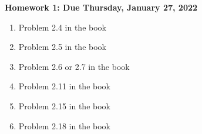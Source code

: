 \documentclass[11pt]{article}
\begin{document}
\newcommand{\problem}[1]{%
\item {#1}
}
\newcommand{\probl}[1]{\label{#1}}
\def\be{\begin{equation}}
\def\ee{\end{equation}}
\def\bea{\begin{eqnarray}}
\def\eea{\end{eqnarray}}
\newcommand{\vs}{\nonumber\\}
\def\across{a^\times}
\def\tcross{T^\times}
\def\ccross{C^\times}
\newcommand{\ec}[1]{Eq.~(\ref{eq:#1})}
\newcommand{\eec}[2]{Eqs.~(\ref{eq:#1}) and (\ref{eq:#2})}
\newcommand{\Ec}[1]{(\ref{eq:#1})}
\newcommand{\eql}[1]{\label{eq:#1}}
\newcommand{\sfig}[2]{
\texttt{[image: \#1]}
        }
\newcommand{\sfigr}[2]{
\texttt{[image: \#1]}
        }
\newcommand{\sfigra}[2]{
\texttt{[image: \#1]}
        }
\newcommand{\Sfig}[2]{
   \begin{figure}[thbp]
   \begin{center}
    \sfig{#1.pdf}{0.5\columnwidth}
    \caption{{\small #2}}
    \label{fig:#1}
     \end{center}
   \end{figure}
}
\newcommand\dirac{\delta_D}
\newcommand{\rf}[1]{\ref{fig:#1}}
\newcommand\rhoc{\rho_{\rm cr}}
\newcommand\zs{D_S}
\newcommand\dts{\Delta t_{\rm Sh}}
\newcommand\zle{D_L}
\newcommand\zsl{D_{SL}}
\newcommand\sh{\gamma}
\newcommand\surb{\mathcal{S}}
\newcommand\psf{\mathcal{P}}
\newcommand\spsf{\sigma_{\rm PSF}}
\newcommand\bei{\begin{itemize}}
\newcommand\eei{\end{itemize}}
\begin{centering}
{\bf Homework 1: Due Thursday, January 27, 2022}
\end{centering}

\begin{enumerate}

\problem{Problem 2.4 in the book}
\problem{Problem 2.5 in the book}
\problem{Problem 2.6 or 2.7 in the book}
\problem{Problem 2.11 in the book}
\problem{Problem 2.15 in the book}
\problem{Problem 2.18 in the book}

\end{enumerate}
\end{document}
